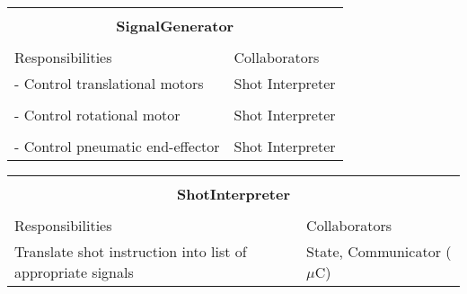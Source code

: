 \documentclass[titlepage]{article}
\begin{document}
\begin{table}[!htbp]
\centering
\begin{tabular}{| p{} | p{} |}\hline
	\multicolumn{2}{|l|}{}\\
	\multicolumn{2}{|c|}{\large{\textbf{SignalGenerator}}}\\
	\multicolumn{2}{|l|}{}\\\hline
	\vspace{0mm}\large{Responsibilities}\vspace{2mm} &\vspace{0mm}\large{Collaborators}\vspace{2mm}\\\hline
	\vspace{0mm}- Control translational motors		&\vspace{0mm}Shot Interpreter\\&\\
	- Control rotational motor						&Shot Interpreter\\&\\
	- Control pneumatic end-effector\vspace{2mm}	&Shot Interpreter\vspace{2mm}\\\hline
\end{tabular}
\end{table}
\newpage

\begin{table}[!htbp]
\centering
\begin{tabular}{| p{} | p{} |}\hline
	\multicolumn{2}{|l|}{}\\
	\multicolumn{2}{|c|}{\large{\textbf{ShotInterpreter}}}\\
	\multicolumn{2}{|l|}{}\\\hline
	\vspace{0mm}\large{Responsibilities}\vspace{2mm} &\vspace{0mm}\large{Collaborators}\vspace{2mm}\\\hline
	\vspace{0mm}Translate shot instruction into list of appropriate signals 	&\vspace{0mm}State, Communicator ($\mu$C)\vspace{2mm}\\\hline
\end{tabular}
\end{table}
\end{document}
